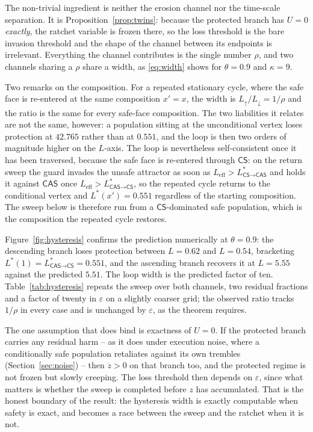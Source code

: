 \documentclass[11pt,a4paper]{article}
\theoremstyle{definition}
\newcommand{\CS}{\textsf{CS}}
\newcommand{\CAS}{\textsf{CAS}}
\begin{document}
The non-trivial ingredient is neither the erosion channel nor the time-scale
separation. It is Proposition~\ref{prop:twins}: because the protected branch
has $U=0$ \emph{exactly}, the ratchet variable is frozen there, so the loss
threshold is the bare invasion threshold and the shape of the channel between
its endpoints is irrelevant. Everything the channel contributes is the single
number $\rho$, and two channels sharing a $\rho$ share a width, as
\eqref{eq:width} shows for $\theta=0.9$ and $\kappa=9$.

Two remarks on the composition. For a repeated stationary cycle, where the
safe face is re-entered at the same composition $x'=x$, the width is
$L_{\uparrow}/L_{\downarrow}=1/\rho$ and the ratio is the same for every safe-face
composition. The two liabilities it relates are not the same, however: a
population sitting at the unconditional vertex loses protection at $42.765$
rather than at $0.551$, and the loop is then two orders of magnitude higher on
the $L$-axis. The loop is nevertheless self-consistent once it has been
traversed, because the safe face is re-entered through $\CS$: on the return
sweep the guard invades the unsafe attractor as soon as
$L_{\mathrm{eff}}>L^{*}_{\CS\to\CAS}$ and holds it against $\CAS$ once
$L_{\mathrm{eff}}>L^{*}_{\CAS\to\CS}$, so the repeated cycle returns to the
conditional vertex and $L^{*}(x')=0.551$ regardless of the starting
composition. The sweep below is therefore run from a $\CS$-dominated safe
population, which is the composition the repeated cycle restores.

Figure~\ref{fig:hysteresis} confirms the prediction numerically at
$\theta=0.9$: the descending branch loses protection between $L=0.62$ and
$L=0.54$, bracketing $L^{*}(1)=L^{*}_{\CAS\to\CS}=0.551$, and the ascending
branch recovers it at $L=5.55$ against the predicted $5.51$. The loop width is
the predicted factor of ten. Table~\ref{tab:hysteresis} repeats the sweep over
both channels, two residual fractions and a factor of twenty in $\varepsilon$
on a slightly coarser grid; the observed ratio tracks $1/\rho$ in every case
and is unchanged by $\varepsilon$, as the theorem requires.



The one assumption that does bind is exactness of $U=0$. If the protected
branch carries any residual harm -- as it does under execution noise, where a
conditionally safe population retaliates against its own trembles
(Section~\ref{sec:noise}) -- then $\dot z>0$ on that branch too, and the
protected regime is not frozen but slowly creeping. The loss threshold then
depends on $\varepsilon$, since what matters is whether the sweep is completed
before $z$ has accumulated. That is the honest boundary of the result: the
hysteresis width is exactly computable when safety is exact, and becomes a
race between the sweep and the ratchet when it is not.
\end{document}
